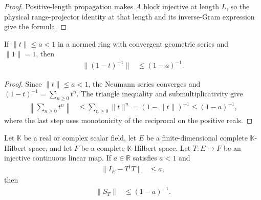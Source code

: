 \begin{proof}
    \leanok
    Positive-length propagation makes $A$ block injective at length $L$, so
    the physical range-projector identity at that length and its inverse-Gram
    expression give the formula.
\end{proof}

\begin{lemma}
    \label{thm:neumann_inverse_norm_bound}
    \leanok
    If $\lVert t\rVert\le a<1$ in a normed ring with convergent geometric
    series and $\lVert 1\rVert=1$, then
    \begin{align}
        \lVert(1-t)^{-1}\rVert & \le(1-a)^{-1}.
    \end{align}
\end{lemma}

\begin{proof}
    \leanok
    Since $\lVert t\rVert\le a<1$, the Neumann series converges and
    $(1-t)^{-1}=\sum_{n\ge0}t^n$.  The triangle inequality and
    submultiplicativity give
    \begin{align}
        \left\lVert\sum_{n\ge0}t^n\right\rVert
         & \le \sum_{n\ge0}\lVert t\rVert^n
        =(1-\lVert t\rVert)^{-1}
        \le(1-a)^{-1},
    \end{align}
    where the last step uses monotonicity of the reciprocal on the positive
    reals.
\end{proof}

\begin{lemma}
    \label{thm:inverse_gram_norm_bound}
    \leanok
    Let $\mathbb K$ be a real or complex scalar field, let $E$ be a
    finite-dimensional complete $\mathbb K$-Hilbert space, and let $F$ be a
    complete $\mathbb K$-Hilbert space.  Let $T\colon E\to F$ be an injective
    continuous linear map.  If $a\in\mathbb R$ satisfies $a<1$ and
    \begin{align}
        \lVert I_E-T^\dagger T\rVert & \le a,
    \end{align}
    then
    \begin{align}
        \lVert S_T\rVert & \le(1-a)^{-1}.
    \end{align}
\end{lemma}

